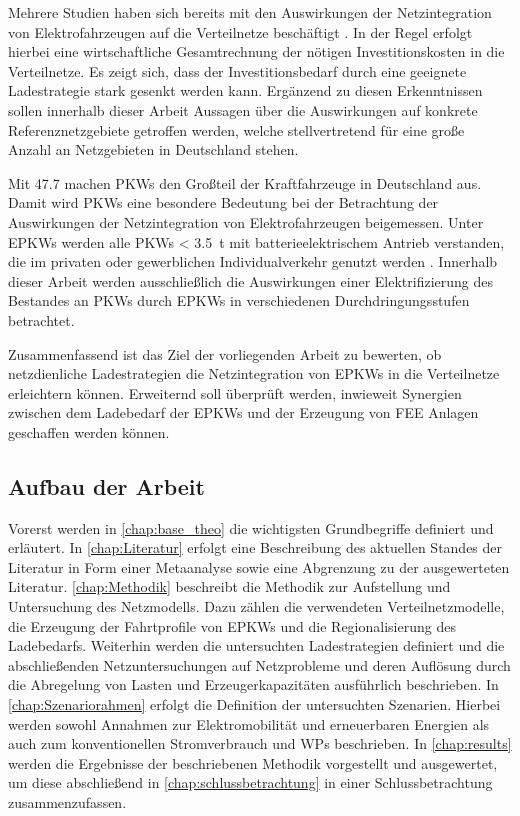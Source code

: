Mehrere Studien haben sich bereits mit den Auswirkungen der Netzintegration von Elektrofahrzeugen auf die Verteilnetze beschäftigt \cite{Agora2019} \cite{DEAGH2018} \cite{BCG2018}.
In der Regel erfolgt hierbei eine wirtschaftliche Gesamtrechnung der nötigen Investitionskosten in die Verteilnetze.
Es zeigt sich, dass der Investitionsbedarf durch eine geeignete Ladestrategie stark gesenkt werden kann.
Ergänzend zu diesen Erkenntnissen sollen innerhalb dieser Arbeit Aussagen über die Auswirkungen auf konkrete Referenznetzgebiete getroffen werden, welche stellvertretend für eine große Anzahl an Netzgebieten in Deutschland stehen.\medskip

Mit \SI{47.7}{\MioFZs} \cite{KBA2020a} machen \glspl{PKW} den Großteil der Kraftfahrzeuge in Deutschland aus.
Damit wird \glspl{PKW} eine besondere Bedeutung bei der Betrachtung der Auswirkungen der Netzintegration von Elektrofahrzeugen beigemessen.
Unter \glspl{EPKW} werden alle \glspl{PKW} \SI{< 3.5}{\tonne} mit batterieelektrischem Antrieb verstanden, die im privaten oder gewerblichen Individualverkehr genutzt werden \cite{BNetzA2020}.
Innerhalb dieser Arbeit werden ausschließlich die Auswirkungen einer Elektrifizierung des Bestandes an \glspl{PKW} durch \glspl{EPKW} in verschiedenen Durchdringungsstufen betrachtet.\medskip

Zusammenfassend ist das Ziel der vorliegenden Arbeit zu bewerten, ob netzdienliche Ladestrategien die Netzintegration von \glspl{EPKW} in die Verteilnetze erleichtern können.
Erweiternd soll überprüft werden, inwieweit Synergien zwischen dem Ladebedarf der \glspl{EPKW} und der Erzeugung von \gls{FEE} Anlagen geschaffen werden können.


\subsection{Aufbau der Arbeit}

Vorerst werden in \autoref{chap:base_theo} die wichtigsten Grundbegriffe definiert und erläutert.
In \autoref{chap:Literatur} erfolgt eine Beschreibung des aktuellen Standes der Literatur in Form einer Metaanalyse sowie eine Abgrenzung zu der ausgewerteten Literatur.
\autoref{chap:Methodik} beschreibt die Methodik zur Aufstellung und Untersuchung des Netzmodells.
Dazu zählen die verwendeten Verteilnetzmodelle, die Erzeugung der Fahrtprofile von \glspl{EPKW} und die Regionalisierung des Ladebedarfs.
Weiterhin werden die untersuchten Ladestrategien definiert und die abschließenden Netzuntersuchungen auf Netzprobleme und deren Auflösung durch die Abregelung von Lasten und Erzeugerkapazitäten ausführlich beschrieben.
In \autoref{chap:Szenariorahmen} erfolgt die Definition der untersuchten Szenarien.
Hierbei werden sowohl Annahmen zur Elektromobilität und erneuerbaren Energien als auch zum konventionellen Stromverbrauch und \glspl{WP} beschrieben.
In \autoref{chap:results} werden die Ergebnisse der beschriebenen Methodik vorgestellt und ausgewertet, um diese abschließend in \autoref{chap:schlussbetrachtung} in einer Schlussbetrachtung zusammenzufassen.

\clearpage
